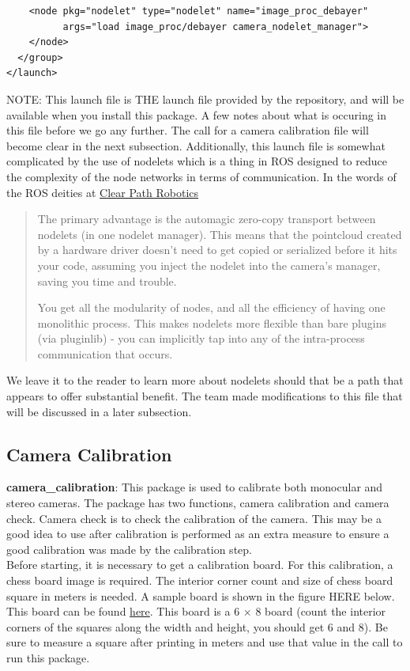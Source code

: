 \begin{itemize}
\begin{lstlisting}
    <node pkg="nodelet" type="nodelet" name="image_proc_debayer"
          args="load image_proc/debayer camera_nodelet_manager">
    </node>
  </group>
</launch>
\end{lstlisting}
NOTE: This launch file is THE launch file provided by the repository, and will be available when you install this package. A few notes about what is occuring in this file before we go any further. The call for a camera calibration file will become clear in the next subsection. Additionally, this launch file is somewhat complicated by the use of nodelets which is a thing in ROS designed to reduce the complexity of the node networks in terms of communication. In the words of the ROS deities at \href{http://www.clearpathrobotics.com/guides/ros/Nodelet%20Everything.html}{Clear Path Robotics}
\begin{quotation}
The primary advantage is the automagic zero-copy transport between nodelets (in one nodelet manager). This means that the pointcloud created by a hardware driver doesn’t need to get copied or serialized before it hits your code, assuming you inject the nodelet into the camera’s manager, saving you time and trouble.

You get all the modularity of nodes, and all the efficiency of having one monolithic process. This makes nodelets more flexible than bare plugins (via pluginlib) - you can implicitly tap into any of the intra-process communication that occurs.
\end{quotation}
We leave it to the reader to learn more about nodelets should that be a path that appears to offer substantial benefit. The team made modifications to this file that will be discussed in a later subsection.
\end{itemize}

\subsection{Camera Calibration}
\noindent \textbf{camera\_calibration}: This package is used to calibrate both monocular and stereo cameras. The package has two functions, camera calibration and camera check. Camera check is to check the calibration of the camera. This may be a good idea to use after calibration is performed as an extra measure to ensure a good calibration was made by the calibration step.\\ 

\noindent Before starting, it is necessary to get a calibration board. For this calibration, a chess board image is required. The interior corner count and size of chess board square in meters is needed. A sample board is shown in the figure HERE below. This board can be found \href{http://wiki.ros.org/camera_calibration/Tutorials/
MonocularCalibration?action=AttachFile&do=view&target=check-108.pdf}{here}. This board is a 6 $\times$ 8 board (count the interior corners of the squares along the width and height, you should get 6 and 8). Be sure to measure a square after printing in meters and use that value in the call to run this package.\\ 

